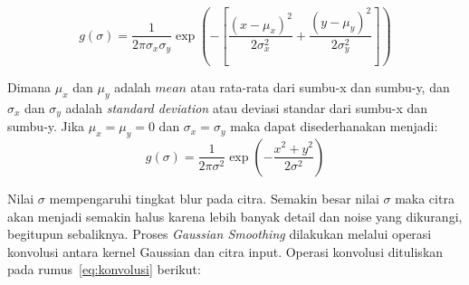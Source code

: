 \begin{equation*}
g(\sigma) = \frac{1}{2\pi\sigma_{x}\sigma_{y}}\exp\left(-\left[\frac{(x - \mu_{x})^{2}}{2\sigma_{x}^2} + \frac{(y - \mu_{y})^{2}}{2\sigma_{y}^2}\right]\right)
\end{equation*}

Dimana \(\mu_{x}\) dan \(\mu_{y}\) adalah \(mean\) atau rata-rata dari sumbu-x dan sumbu-y, dan \(\sigma_{x}\) dan \(\sigma_{y}\) adalah \emph{standard deviation} atau deviasi standar dari sumbu-x dan sumbu-y. Jika \(\mu_{x} = \mu_{y} = 0\) dan \(\sigma_{x} = \sigma_{y}\) maka dapat disederhanakan menjadi:
\begin{equation}
g(\sigma) = \frac{1}{2\pi\sigma^2}\exp\left(-\frac{x^2+y^2}{2\sigma^2}\right)
\label{eq:gaussian kernel}
\end{equation}

Nilai \(\sigma\) mempengaruhi tingkat blur pada citra. Semakin besar nilai \(\sigma\) maka citra akan menjadi semakin halus karena lebih banyak detail dan noise yang dikurangi, begitupun sebaliknya.
Proses \emph{Gaussian Smoothing} dilakukan melalui operasi konvolusi antara kernel Gaussian dan citra input. Operasi konvolusi dituliskan pada rumus~\ref{eq:konvolusi} berikut:





